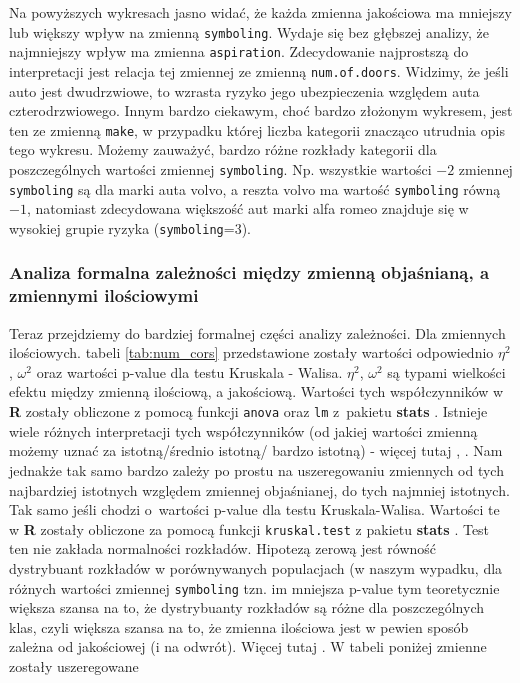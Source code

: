 \documentclass[12pt, a4paper]{article}\usepackage[]{graphicx}\usepackage[]{xcolor}
\begin{document}
Na powyższych wykresach jasno widać, że każda zmienna jakościowa ma mniejszy lub większy wpływ na zmienną \texttt{symboling}. Wydaje się bez głębszej analizy, że najmniejszy wpływ ma zmienna \texttt{aspiration}. Zdecydowanie najprostszą do interpretacji jest relacja tej zmiennej ze zmienną \texttt{num.of.doors}. Widzimy, że jeśli auto jest dwudrzwiowe, to wzrasta ryzyko jego ubezpieczenia względem auta czterodrzwiowego. Innym bardzo ciekawym, choć bardzo złożonym wykresem, jest ten ze zmienną \texttt{make}, w przypadku której liczba kategorii znacząco utrudnia opis tego wykresu. Możemy zauważyć, bardzo różne rozkłady kategorii dla poszczególnych wartości zmiennej \texttt{symboling}. Np. wszystkie wartości $-2$ zmiennej \texttt{symboling} są dla marki auta volvo, a reszta volvo ma wartość \texttt{symboling} równą $-1$, natomiast zdecydowana większość aut marki alfa romeo znajduje się w wysokiej grupie ryzyka (\texttt{symboling}=$3$).

\subsubsection{Analiza formalna zależności między zmienną objaśnianą, a zmiennymi ilościowymi}
 
Teraz przejdziemy do bardziej formalnej części analizy zależności. Dla zmiennych ilościowych. tabeli \ref{tab:num_cors} przedstawione zostały wartości odpowiednio $\eta^2$, $\omega^2$ oraz wartości p-value dla testu Kruskala - Walisa. $\eta^2$, $\omega^2$ są typami wielkości efektu \cite{wiki} między zmienną ilościową, a jakościową. Wartości tych współczynników w \textbf{R} zostały obliczone z pomocą funkcji \texttt{anova} oraz \texttt{lm} z~pakietu \textbf{stats} \cite{anovaR}\cite{lmR}. Istnieje wiele różnych interpretacji tych współczynników (od jakiej wartości zmienną możemy uznać za istotną/średnio istotną/ bardzo istotną) - więcej tutaj \cite{eta}, \cite{omega}.  Nam jednakże tak samo bardzo zależy po prostu na uszeregowaniu zmiennych od tych najbardziej istotnych względem zmiennej objaśnianej, do tych najmniej istotnych. Tak samo jeśli chodzi o~wartości p-value dla testu Kruskala-Walisa. Wartości te w \textbf{R} zostały obliczone za pomocą funkcji \texttt{kruskal.test} z pakietu \textbf{stats} \cite{KruskalR}. Test ten nie zakłada normalności rozkładów. Hipotezą zerową jest równość dystrybuant rozkładów w porównywanych populacjach (w naszym wypadku, dla różnych wartości zmiennej \texttt{symboling} tzn. im mniejsza p-value tym teoretycznie większa szansa na to, że dystrybuanty rozkładów są różne dla poszczególnych klas, czyli większa szansa na to, że zmienna ilościowa jest w pewien sposób zależna od jakościowej (i na odwrót). Więcej tutaj \cite{Kruskal}. W tabeli poniżej zmienne zostały uszeregowane
\end{document}
